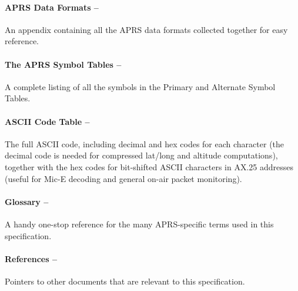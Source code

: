 \paragraph{APRS Data Formats --}An appendix containing all the APRS data formats
collected together for easy reference.

\paragraph{The APRS Symbol Tables --}A complete listing of all the symbols in the
Primary and Alternate Symbol Tables.

\paragraph{ASCII Code Table --}The full ASCII code, including decimal and hex
codes for each character (the decimal code is needed for compressed lat/long
and altitude computations), together with the hex codes for bit-shifted ASCII
characters in AX.25 addresses (useful for Mic-E decoding and general on-air
packet monitoring).


\paragraph{Glossary --}A handy one-stop reference for the many APRS-specific terms
used in this specification.

\paragraph{References --}Pointers to other documents that are relevant to this
specification.

